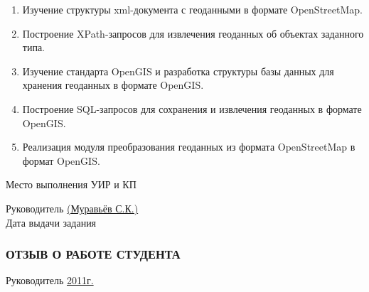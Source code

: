\documentclass[12pt,a4paper,oneside]{article} %
\begin{document}
\large{\begin{enumerate}
\item Изучение структуры xml-документа с геоданными в формате \linebreak
OpenStreetMap.
\item Построение XPath-запросов для извлечения геоданных об объектах \linebreak
заданного типа.
\item Изучение стандарта OpenGIS и разработка структуры базы \linebreak
данных для хранения геоданных в формате OpenGIS.
\item Построение SQL-запросов для сохранения и извлечения геоданных \linebreak
в формате OpenGIS.
\item Реализация модуля преобразования геоданных из формата \linebreak
OpenStreetMap в формат OpenGIS.
\end{enumerate}}

\newpage
\normalsize{\begin{flushleft}
Место выполнения УИР и КП \underline{\hspace{11,15cm}}

Руководитель \underline{\hspace{10,95cm} (Муравьёв С.К.)}
\\[8pt]
Дата выдачи задания \underline{\hspace{12,8cm}}
\end{flushleft}

\newpage
\subsubsection*{ОТЗЫВ О РАБОТЕ СТУДЕНТА}

\vfill
Руководитель \underline{\hspace{8cm}\glqq{\hspace{1cm}}\grqq\hspace{4cm}2011г.}}
\end{document}
